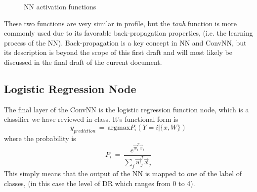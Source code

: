 \documentclass[letterpaper,12pt]{article}
\begin{document}
\begin{figure}[htbp]
\begin{center}
\caption{NN activation functions}
\label{marking_image}
\end{center}
\end{figure}

These two functions are very similar in profile, but the \textit{tanh} function is more commonly used due to its favorable back-propagation properties, (i.e. the learning process of the NN). Back-propagation is a key concept in NN and ConvNN, but its description is beyond the scope of this first draft and will most likely be discussed in the final draft of the current document.

\subsection{Logistic Regression Node}

The final layer of the ConvNN is the logistic regression function node, which is a classifier we have reviewed in class. It's functional form is \cite{deep}
\begin{equation}
y_{prediction} \, = \, \text{argmax} P_i (Y = i | \{x, W\})
\end{equation}
where the probability is
\begin{equation}
P_i \, = \, \frac{e^{\vec{w}_i^T \vec{x}_i}}{\sum_j \vec{w}_j^T \vec{x}_j }
\end{equation}
This simply means that the output of the NN is mapped to one of the label of classes, (in this case the level of DR which ranges from 0 to 4).
\end{document}
